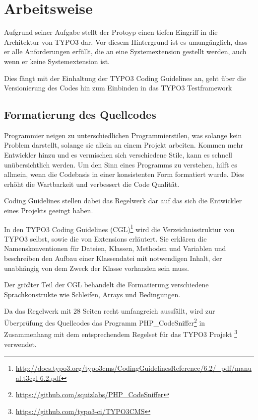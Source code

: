 \section{Arbeitsweise}
\label{sec:workstyle}
Aufgrund seiner Aufgabe stellt der Protoyp einen tiefen Eingriff in die Architektur von TYPO3 dar. Vor diesem Hintergrund ist es umungänglich, dass er alle Anforderungen erfüllt, die an eine Systemextension gestellt werden, auch wenn er keine Systemextension ist.

Dies fängt mit der Einhaltung der TYPO3 Coding Guidelines an, geht über die Versionierung des Codes hin zum Einbinden in das TYPO3 Testframework

\subsection{Formatierung des Quellcodes}
Programmier neigen zu unterschiedlichen Programmierstilen, was solange kein Problem darstellt, solange sie allein an einem Projekt arbeiten. Kommen mehr Entwickler hinzu und es vermischen sich verschiedene Stile, kann es schnell unübersichtlich werden. Um den Sinn eines Programms zu verstehen, hilft es allmein, wenn die Codebasis in einer konsistenten Form formatiert wurde. Dies erhöht die Wartbarkeit und verbessert die Code Qualität.

Coding Guidelines stellen dabei das Regelwerk dar auf das sich die Entwickler eines Projekts geeingt haben.

In den TYPO3 Coding Guidelines (CGL)\footnote{\url{http://docs.typo3.org/typo3cms/CodingGuidelinesReference/6.2/_pdf/manual.t3cgl-6.2.pdf}} wird die Verzeichnisstruktur von TYPO3 selbst, sowie die von Extensions erläutert. Sie erklären die Namenskonventionen für Dateien, Klassen, Methoden und Variablen und beschreiben den Aufbau einer Klassendatei mit notwendigen Inhalt, der unabhängig von dem Zweck der Klasse vorhanden sein muss.

Der größter Teil der CGL behandelt die Formatierung verschiedene Sprachkonstrukte wie Schleifen, Arrays und Bedingungen.

Da das Regelwerk mit 28 Seiten recht umfangreich aussfällt, wird zur Überprüfung des Quellcodes das Programm PHP\_CodeSniffer\footnote{\url{https://github.com/squizlabs/PHP_CodeSniffer}} in Zusammenhang mit dem entsprechendem Regelset für das TYPO3 Projekt \footnote{\url{https://github.com/typo3-ci/TYPO3CMS}} verwendet.

